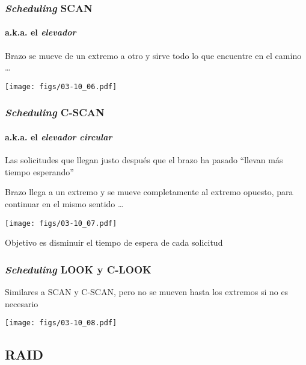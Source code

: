 \documentclass[letter]{beamer}
\begin{document}
\begin{frame}
  \frametitle{{\em Scheduling} SCAN}
  \framesubtitle{a.k.a. el {\em elevador}}

  Brazo se mueve de un extremo a otro y sirve todo lo que encuentre en el camino \ldots
  
  \begin{center}
    \texttt{[image: figs/03-10\_06.pdf]}
  \end{center}

\end{frame}
\begin{frame}
  \frametitle{{\em Scheduling} C-SCAN}
  \framesubtitle{a.k.a. el {\em elevador circular} }

  Las solicitudes que llegan justo después que el brazo ha pasado
  ``llevan más tiempo esperando''
  
  Brazo llega a un extremo y se mueve completamente al extremo opuesto, para continuar en el mismo sentido
  \ldots {}
  
  \begin{center}
    \texttt{[image: figs/03-10\_07.pdf]}
  \end{center}

  Objetivo es disminuir el tiempo de espera de cada solicitud
\end{frame}

\begin{frame}
  \frametitle{{\em Scheduling} LOOK y C-LOOK}

  Similares a SCAN y C-SCAN, pero no se mueven hasta los extremos si no es necesario

  \begin{center}
    \texttt{[image: figs/03-10\_08.pdf]}
  \end{center}
  
  
\end{frame}
\subsection{RAID}
\end{document}
